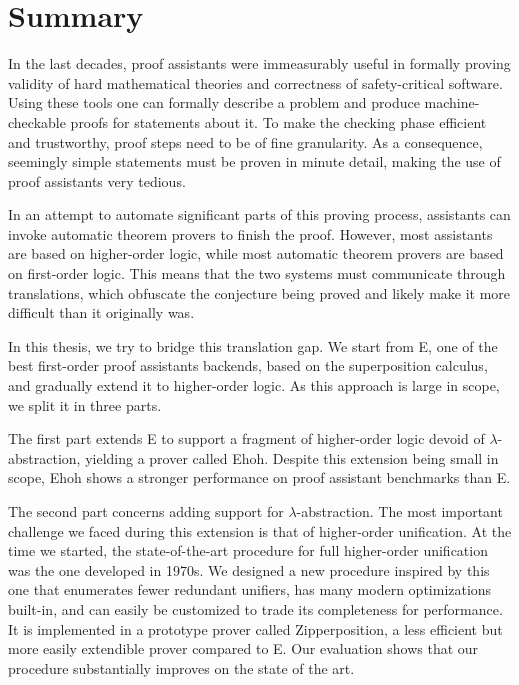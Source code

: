 \chapter*{Summary}

In the last decades, proof assistants were immeasurably useful in formally
proving validity of hard mathematical theories and correctness of
safety-critical software. Using these tools one can formally describe a problem
and produce machine-checkable proofs for statements about it. To make the
checking phase efficient and trustworthy, proof steps need to be of fine
granularity. As a consequence, seemingly simple statements must be proven in
minute detail, making the use of proof assistants very tedious.

In an attempt to automate significant parts of this proving process, assistants
can invoke automatic theorem provers to finish the proof. However, most
assistants are based on higher-order logic, while most automatic theorem provers
are based on first-order logic. This means that the two systems must communicate
through translations, which obfuscate the conjecture being proved and likely make it more
difficult than it originally was.

In this thesis, we try to bridge this translation gap. We start from E, one of the best
first-order proof assistants backends, based on the superposition calculus, and
gradually extend it to higher-order logic. As this approach is large in scope,
we split it in three parts.

The first part extends E to support a fragment of higher-order logic devoid of
$\lambda$-abstra\-ction, yielding a prover called Ehoh. Despite this extension being small in scope, 
Ehoh shows a stronger performance on proof assistant benchmarks than E.

The second part concerns adding support for $\lambda$-abstraction. The most
important challenge we faced during this extension is that of higher-order
unification. At the time we started, the state-of-the-art procedure
for full higher-order unification was the one developed in 1970s. We designed a new
procedure inspired by this one that enumerates fewer redundant unifiers, has many
modern optimizations built-in, and can easily be customized to trade its
completeness for performance. It is implemented in a
prototype prover called Zipperposition, a less efficient but more easily extendible
prover compared to E. Our evaluation shows that our
procedure substantially improves on the state of the art.

